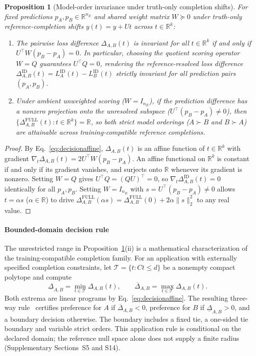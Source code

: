 \documentclass[preprint,12pt,number,sort&compress]{elsarticle}
\newtheorem{proposition}{Proposition}
\newcommand{\R}{\mathbb{R}}
\begin{document}
\begin{proposition}[Model-order invariance under truth-only completion shifts]\label{prop:order}
For fixed predictions $p_A, p_B \in \R^{n_E}$ and shared weight matrix $W \succeq 0$ under truth-only reference-completion shifts $y(t) = y + Ut$ across $t \in \R^k$:
\begin{enumerate}[label=(\roman*)]
\item The pairwise loss difference $\Delta_{A,B}(t)$ is invariant for all $t \in \R^k$ if and only if $U^\top W (p_B - p_A) = 0$. In particular, choosing the quotient scoring operator $W = Q$ guarantees $U^\top Q = 0$, rendering the reference-resolved loss difference $\Delta_{A,B}^{\mathrm{ID}}(t) = L_A^{\mathrm{ID}}(t) - L_B^{\mathrm{ID}}(t)$ strictly invariant for all prediction pairs $(p_A, p_B)$.
\item Under ambient unweighted scoring ($W = I_{n_E}$), if the prediction difference has a nonzero projection onto the unresolved subspace ($U^\top(p_B - p_A) \neq 0$), then $\{\Delta_{A,B}^{\mathrm{FULL}}(t) : t \in \R^k\} = \R$, so both strict model orderings ($A \succ B$ and $B \succ A$) are attainable across training-compatible reference completions.
\end{enumerate}
\end{proposition}
\begin{proof}
By Eq.~\eqref{eq:decisionaffine}, $\Delta_{A,B}(t)$ is an affine function of $t \in \R^k$ with gradient $\nabla_t \Delta_{A,B}(t) = 2 U^\top W (p_B - p_A)$. An affine functional on $\R^k$ is constant if and only if its gradient vanishes, and surjects onto $\R$ whenever its gradient is nonzero. Setting $W = Q$ gives $U^\top Q = (QU)^\top = 0$, so $\nabla_t \Delta_{A,B}^{\mathrm{ID}}(t) = 0$ identically for all $p_A, p_B$. Setting $W = I_{n_E}$ with $s = U^\top(p_B - p_A) \neq 0$ allows $t = \alpha s$ ($\alpha \in \R$) to drive $\Delta_{A,B}^{\mathrm{FULL}}(\alpha s) = \Delta_{A,B}^{\mathrm{FULL}}(0) + 2\alpha \|s\|_2^2$ to any real value.
\end{proof}

\paragraph{Bounded-domain decision rule}
The unrestricted range in Proposition~\ref{prop:order}(ii) is a mathematical characterization of the training-compatible completion family. For an application with externally specified completion constraints, let $\mathcal{T}=\{t:Ct\le d\}$ be a nonempty compact polytope and compute
\[
\underline{\Delta}_{A,B}=\min_{t\in\mathcal{T}}\Delta_{A,B}(t),\qquad
\overline{\Delta}_{A,B}=\max_{t\in\mathcal{T}}\Delta_{A,B}(t).
\]
Both extrema are linear programs by Eq.~\eqref{eq:decisionaffine}. The resulting three-way rule~\cite{li2026incomplete,zhang2026adaptive} certifies preference for $A$ if $\overline{\Delta}_{A,B}<0$, preference for $B$ if $\underline{\Delta}_{A,B}>0$, and a boundary decision otherwise. The boundary includes a fixed tie, a one-sided tie boundary and variable strict orders. This application rule is conditional on the declared domain; the reference null space alone does not supply a finite radius (Supplementary Sections~S5 and S14).
\end{document}
